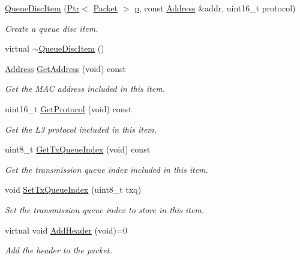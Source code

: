 \begin{DoxyCompactItemize}
\item 
\hyperlink{classns3_1_1QueueDiscItem_aaa9a2a6f16776e09cb4b1fff5e9ac94f}{Queue\+Disc\+Item} (\hyperlink{classns3_1_1Ptr}{Ptr}$<$ \hyperlink{classns3_1_1Packet}{Packet} $>$ \hyperlink{lte__link__budget__x2__handover__measures_8m_ac9de518908a968428863f829398a4e62}{p}, const \hyperlink{classns3_1_1Address}{Address} \&addr, uint16\+\_\+t protocol)
\begin{DoxyCompactList}\small\item\em Create a queue disc item. \end{DoxyCompactList}\item 
virtual \hyperlink{classns3_1_1QueueDiscItem_a7e9402a7a72c8fbc2928cab29b6edb22}{$\sim$\+Queue\+Disc\+Item} ()
\item 
\hyperlink{classns3_1_1Address}{Address} \hyperlink{classns3_1_1QueueDiscItem_ac13b6adb92790c4e850698a3a11fd448}{Get\+Address} (void) const 
\begin{DoxyCompactList}\small\item\em Get the M\+AC address included in this item. \end{DoxyCompactList}\item 
uint16\+\_\+t \hyperlink{classns3_1_1QueueDiscItem_aa1538ff5222ab86652d21d005ad839a4}{Get\+Protocol} (void) const 
\begin{DoxyCompactList}\small\item\em Get the L3 protocol included in this item. \end{DoxyCompactList}\item 
uint8\+\_\+t \hyperlink{classns3_1_1QueueDiscItem_ac0f4a13528a69cb352cb7549fe3eb574}{Get\+Tx\+Queue\+Index} (void) const 
\begin{DoxyCompactList}\small\item\em Get the transmission queue index included in this item. \end{DoxyCompactList}\item 
void \hyperlink{classns3_1_1QueueDiscItem_abf1144380cec5f16b2cf8d7fe14e05da}{Set\+Tx\+Queue\+Index} (uint8\+\_\+t txq)
\begin{DoxyCompactList}\small\item\em Set the transmission queue index to store in this item. \end{DoxyCompactList}\item 
virtual void \hyperlink{classns3_1_1QueueDiscItem_a246c04e645f1907a2cd47cd79f9ef9b9}{Add\+Header} (void)=0
\begin{DoxyCompactList}\small\item\em Add the header to the packet. \end{DoxyCompactList}\item 

\end{DoxyCompactItemize}
